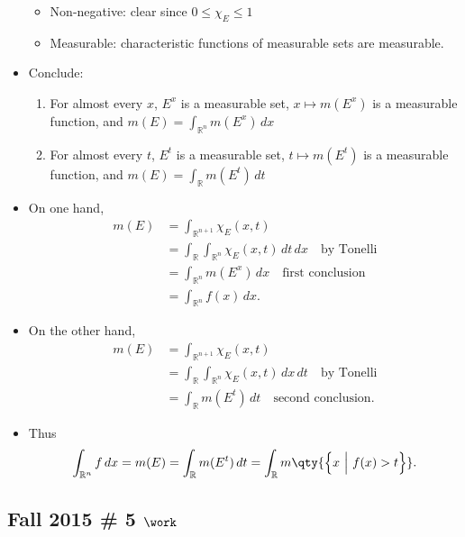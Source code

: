 \begin{solution}
\begin{itemize}
  \begin{itemize}
  \tightlist
  \item
    Non-negative: clear since \(0\leq \chi_E \leq 1\)
  \item
    Measurable: characteristic functions of measurable sets are
    measurable.
  \end{itemize}
\item
  Conclude:

  \begin{enumerate}
  \def\labelenumi{\arabic{enumi}.}
  \tightlist
  \item
    For almost every \(x\), \(E^x\) is a measurable set,
    \(x\mapsto m(E^x)\) is a measurable function, and
    \(m(E) = \int_{{\mathbb{R}}^n} m(E^x) \, dx\)
  \item
    For almost every \(t\), \(E^t\) is a measurable set,
    \(t\mapsto m(E^t)\) is a measurable function, and
    \(m(E) = \int_{{\mathbb{R}}} m(E^t) \, dt\)
  \end{enumerate}
\item
  On one hand,
  \begin{align*}
  m(E) 
  &= \int_{{\mathbb{R}}^{n+1}} \chi_E(x, t) \\
  &= \int_{{\mathbb{R}}} \int_{{\mathbb{R}}^n} \chi_E(x, t) \,dt \,dx \quad\text{by Tonelli}\\
  &= \int_{{\mathbb{R}}^n} m(E^x) \,dx \quad\text{first conclusion}\\
  &= \int_{{\mathbb{R}}^n} f(x) \,dx 
  .\end{align*}
\item
  On the other hand,
  \begin{align*}
  m(E) 
  &= \int_{{\mathbb{R}}^{n+1}} \chi_E(x, t) \\
  &= \int_{\mathbb{R}}\int_{{\mathbb{R}}^n} \chi_E(x, t) \, dx \,dt \quad\text{by Tonelli} \\
  &= \int_{\mathbb{R}}m(E^t) \,dt \quad\text{second conclusion}
  .\end{align*}
\item
  Thus
  \begin{align*}
  \int_{{\mathbb{R}}^n} f \,dx = m(E) = \int_{\mathbb{R}}m(E^t) \,dt = \int_{\mathbb{R}}m\qty{\left\{{x{~\mathrel{\Big|}~}f(x) > t}\right\}}
  .\end{align*}
\end{itemize}

\end{solution}

\hypertarget{fall-2015-5-work}{%
\subsection{\texorpdfstring{Fall 2015 \# 5
\(\work\)}{Fall 2015 \# 5 \textbackslash work}}\label{fall-2015-5-work}}

